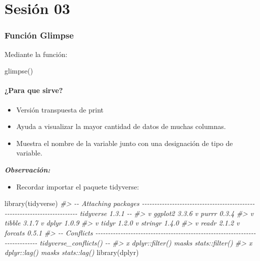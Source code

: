 \documentclass[
]{book}
\newenvironment{Shaded}{\begin{snugshade}}{\end{snugshade}}
\newcommand{\CommentTok}[1]{\textcolor[rgb]{0.56,0.35,0.01}{\textit{#1}}}
\newcommand{\FunctionTok}[1]{\textcolor[rgb]{0.00,0.00,0.00}{#1}}
\newcommand{\NormalTok}[1]{#1}
\providecommand{\tightlist}{%
  \setlength{\itemsep}{0pt}\setlength{\parskip}{0pt}}
\begin{document}
\hypertarget{sesiuxf3n-03}{%
\chapter{Sesión 03}\label{sesiuxf3n-03}}

\hypertarget{funciuxf3n-glimpse}{%
\subsection{Función Glimpse}\label{funciuxf3n-glimpse}}

Mediante la función:

\begin{Shaded}
\begin{Highlighting}[]
\FunctionTok{glimpse}\NormalTok{()}
\end{Highlighting}
\end{Shaded}

\hypertarget{para-que-sirve}{%
\subsubsection{¿Para que sirve?}\label{para-que-sirve}}

\begin{itemize}
\item
  Versión transpuesta de print
\item
  Ayuda a visualizar la mayor cantidad de datos de muchas columnas.
\item
  Muestra el nombre de la variable junto con una designación de tipo de variable.
\end{itemize}

\emph{\textbf{Observación:}}

\begin{itemize}
\tightlist
\item
  Recordar importar el paquete tidyverse:
\end{itemize}

\begin{Shaded}
\begin{Highlighting}[]
\FunctionTok{library}\NormalTok{(tidyverse)}
\CommentTok{\#\textgreater{} {-}{-} Attaching packages {-}{-}{-}{-}{-}{-}{-}{-}{-}{-}{-}{-}{-}{-}{-}{-}{-}{-}{-}{-}{-}{-}{-}{-}{-}{-}{-}{-}{-}{-}{-}{-}{-}{-}{-}{-}{-}{-}{-}{-}{-}{-}{-}{-}{-}{-}{-}{-}{-}{-}{-}{-}{-}{-}{-}{-}{-}{-}{-}{-}{-}{-}{-}{-}{-}{-}{-}{-}{-}{-}{-}{-}{-}{-} tidyverse 1.3.1 {-}{-}}
\CommentTok{\#\textgreater{} v ggplot2 3.3.6     v purrr   0.3.4}
\CommentTok{\#\textgreater{} v tibble  3.1.7     v dplyr   1.0.9}
\CommentTok{\#\textgreater{} v tidyr   1.2.0     v stringr 1.4.0}
\CommentTok{\#\textgreater{} v readr   2.1.2     v forcats 0.5.1}
\CommentTok{\#\textgreater{} {-}{-} Conflicts {-}{-}{-}{-}{-}{-}{-}{-}{-}{-}{-}{-}{-}{-}{-}{-}{-}{-}{-}{-}{-}{-}{-}{-}{-}{-}{-}{-}{-}{-}{-}{-}{-}{-}{-}{-}{-}{-}{-}{-}{-}{-}{-}{-}{-}{-}{-}{-}{-}{-}{-}{-}{-}{-}{-}{-}{-}{-}{-}{-}{-}{-}{-}{-}{-}{-}{-}{-}{-}{-}{-}{-}{-}{-}{-}{-}{-} tidyverse\_conflicts() {-}{-}}
\CommentTok{\#\textgreater{} x dplyr::filter() masks stats::filter()}
\CommentTok{\#\textgreater{} x dplyr::lag()    masks stats::lag()}
\FunctionTok{library}\NormalTok{(dplyr)}
\end{Highlighting}
\end{Shaded}
\end{document}
